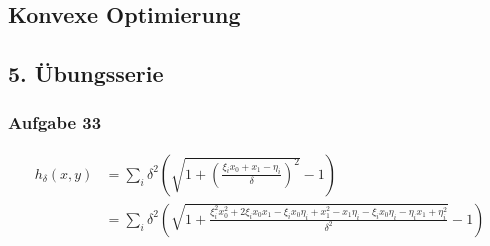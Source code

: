 \documentclass{article}
\begin{document}
\begin{center}
	\section*{Konvexe Optimierung}
	\subsection*{5. Übungsserie}
\end{center}

\subsubsection*{Aufgabe 33}

 \begin{align*}
 h_\delta(x,y) 	&= \sum\limits_i \delta^2 \left( \sqrt{1+\left( \frac { \xi_i x_0 + x_1 -\eta_i}{\delta} \right)^2} -1 \right)\\
&= \sum\limits_i \delta^2 \left( \sqrt{1+ \frac {\xi_i^2 x_0^2 + 2 \xi_i x_0 x_1 - \xi_i x_0 \eta_i + x_1^2 -x_1 \eta_i -\xi_i x_0 \eta_i - \eta_i x_1 + \eta_i^2}{\delta^2}} -1 \right)\\
\end{align*}
\end{document}

